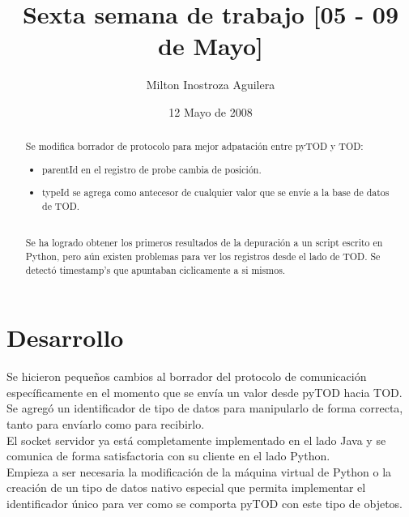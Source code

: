 \documentclass[10pt,a4paper]{article}
\begin{document}
\renewcommand{\contentsname}{Indice} 
\renewcommand\listfigurename{Lista de Figuras}
\renewcommand\listtablename{Lista de Tablas}
\newcommand\bibname{Bibliografía}
\renewcommand{\refname}{Bibliografía}
\renewcommand\indexname{Indice alfabético}
\renewcommand\figurename{Figura}
\renewcommand\tablename{Tabla}
\renewcommand\partname{Parte}
\newcommand\chaptername{Capítulo}
\renewcommand\appendixname{Apéndice}
\renewcommand\abstractname{Resumen}

\title{Sexta semana de trabajo [05 - 09 de Mayo]}
\author{Milton Inostroza Aguilera}
\date{12 Mayo de 2008}
\clearpage
\maketitle

\begin{abstract}

Se modifica borrador de protocolo para mejor adpatación entre pyTOD y TOD:
\begin{itemize}
\item parentId en el registro de probe cambia de posición.
\item typeId se agrega como antecesor de cualquier valor que se envíe a la base de datos de TOD.
\end{itemize}
\\
Se ha logrado obtener los primeros resultados de la depuración a un script escrito en Python, pero aún existen problemas para ver los registros desde el lado de TOD.  Se detectó timestamp's que apuntaban ciclicamente a si mismos.


\end{abstract}
\newpage
\tableofcontents
\newpage
\listoffigures
\newpage
\listoftables
\newpage
\section{Desarrollo}

Se hicieron pequeños cambios al borrador del protocolo de comunicación específicamente en el momento que se envía un valor desde pyTOD hacia TOD.  Se agregó un identificador de tipo de datos para manipularlo de forma correcta, tanto para envíarlo como para recibirlo.\\

El socket servidor ya está completamente implementado en el lado Java y se comunica de forma satisfactoria con su cliente en el lado Python.\\

Empieza a ser necesaria la modificación de la máquina virtual de Python o la creación de un tipo de datos nativo especial que permita implementar el identificador único para ver como se comporta pyTOD con este tipo de objetos.
\end{document}
